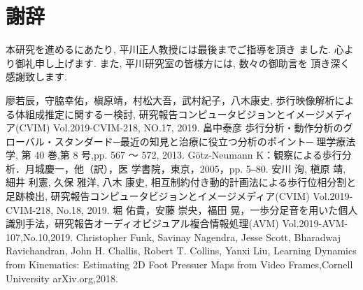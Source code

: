 \documentclass[a4j,10.5pt]{jreport}
\renewcommand{\bibname}{参考文献}
\begin{document}
\chapter*{謝辞}
本研究を進めるにあたり, 平川正人教授には最後までご指導を頂き
ました. 心より御礼申し上げます. また, 平川研究室の皆様方には, 数々の御助言を
頂き深く感謝致します.


% 
\begin{thebibliography}{99}

   廖若辰，守脇幸佑，槇原靖，村松大吾，武村紀子，八木康史, 歩行映像解析による体組成推定に関するー検討, 研究報告コンピュータビジョンとイメージメディア(CVIM) Vol.2019-CVIM-218, NO.17, 2019.
   畠中泰彦 歩行分析・動作分析のグローバル・スタンダード─最近の知見と治療に役立つ分析のポイント─ 理学療法学, 第 40 巻,第 8 号,pp. 567 ～ 572, 2013.
   Götz-Neumann K：観察による歩行分析．月城慶一，他（訳），医
学書院，東京，2005，pp. 5‒80.
 安川 洵, 槇原 靖, 細井 利憲, 久保 雅洋, 八木 康史, 相互制約付き動的計画法による歩行位相分割と足跡検出, 研究報告コンピュータビジョンとイメージメディア(CVIM) Vol.2019-CVIM-218, No.18, 2019.
 堀 佑貴，安藤 崇央，福田 晃，一歩分足音を用いた個人識別手法，研究報告オーディオビジュアル複合情報処理(AVM) Vol.2019-AVM-107,No.10,2019.
 Christopher Funk, Savinay Nagendra, Jesse Scott, Bharadwaj Ravichandran, John H. Challis, Robert T. Collins, Yanxi Liu, Learning Dynamics from Kinematics: Estimating 2D Foot Pressuer Maps from Video Frames,Cornell University arXiv.org,2018.

\end{thebibliography}
\addcontentsline{toc}{chapter}{\bibname}
\end{document}

